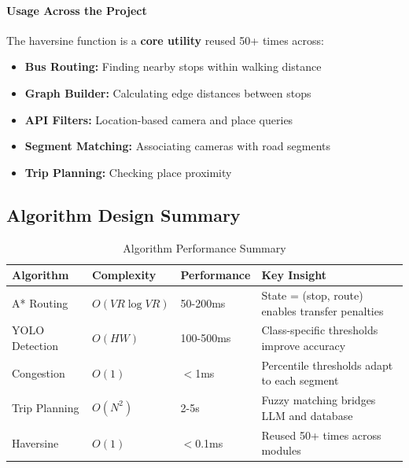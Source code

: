 \paragraph{Usage Across the Project}
The haversine function is a \textbf{core utility} reused 50+ times across:
\begin{itemize}[noitemsep]
    \item \textbf{Bus Routing:} Finding nearby stops within walking distance
    \item \textbf{Graph Builder:} Calculating edge distances between stops
    \item \textbf{API Filters:} Location-based camera and place queries
    \item \textbf{Segment Matching:} Associating cameras with road segments
    \item \textbf{Trip Planning:} Checking place proximity
\end{itemize}

\subsection{Algorithm Design Summary}

\begin{table}[H]
    \centering
    \renewcommand{\arraystretch}{1.3}
    \begin{tabularx}{\textwidth}{|l|l|l|X|}
        \hline
        \textbf{Algorithm} & \textbf{Complexity} & \textbf{Performance} & \textbf{Key Insight} \\
        \hline
        A* Routing & $O(VR \log VR)$ & 50-200ms & State = (stop, route) enables transfer penalties \\
        \hline
        YOLO Detection & $O(HW)$ & 100-500ms & Class-specific thresholds improve accuracy \\
        \hline
        Congestion & $O(1)$ & $<$1ms & Percentile thresholds adapt to each segment \\
        \hline
        Trip Planning & $O(N^2)$ & 2-5s & Fuzzy matching bridges LLM and database \\
        \hline
        Haversine & $O(1)$ & $<$0.1ms & Reused 50+ times across modules \\
        \hline
    \end{tabularx}
    \caption{Algorithm Performance Summary}
\end{table}

